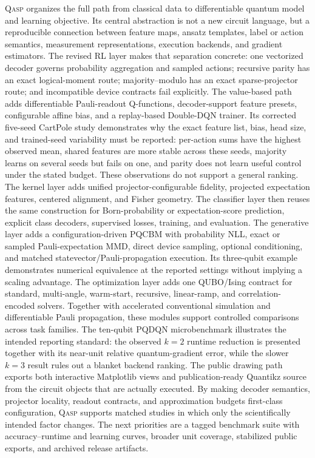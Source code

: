 \documentclass[10pt]{article}
\newcommand{\qasp}{\textsc{Qasp}}
\begin{document}
\qasp{} organizes the full path from classical data to differentiable quantum
model and learning objective.  Its central abstraction is not a new circuit
language, but a reproducible connection between feature maps, ansatz
templates, label or action semantics, measurement representations, execution
backends, and gradient estimators.  The revised RL layer makes that separation
concrete: one vectorized decoder governs probability aggregation and sampled
actions; recursive parity has an exact logical-moment route;
majority--modulo has an exact sparse-projector route; and incompatible device
contracts fail explicitly.  The value-based path adds differentiable
Pauli-readout Q-functions, decoder-support feature presets, configurable affine
bias, and a replay-based Double-DQN trainer.  Its corrected five-seed CartPole
study demonstrates why the exact feature list, bias, head size, and
trained-seed variability must be reported: per-action sums have the highest
observed mean, shared features are more stable across these seeds, majority
learns on several seeds but fails on one, and parity does not learn useful
control under the stated budget.  These observations do not support a general
ranking.  The kernel layer adds unified
projector-configurable fidelity, projected expectation features, centered
alignment, and Fisher geometry.  The classifier layer then reuses the same
construction for Born-probability or expectation-score prediction, explicit
class decoders, supervised losses, training, and evaluation.  The generative
layer adds a configuration-driven PQCBM with probability NLL, exact or sampled
Pauli-expectation MMD, direct device sampling, optional conditioning, and
matched statevector/Pauli-propagation execution.  Its three-qubit example
demonstrates numerical equivalence at the reported settings without implying a
scaling advantage.  The optimization layer adds one QUBO/Ising contract for
standard, multi-angle, warm-start, recursive, linear-ramp, and
correlation-encoded solvers.  Together with accelerated conventional
simulation and differentiable Pauli propagation, these modules support
controlled comparisons across task families.  The ten-qubit PQDQN
microbenchmark illustrates the intended reporting standard: the observed
$k=2$ runtime reduction is presented together with its near-unit relative
quantum-gradient error, while the slower $k=3$ result rules out a blanket
backend ranking.  The public drawing path exports both interactive Matplotlib views
and publication-ready Quantikz source from the circuit objects that are
actually executed.  By making decoder semantics, projector locality, readout
contracts, and approximation budgets first-class configuration, \qasp{}
supports matched studies in which only the scientifically intended factor
changes.  The next priorities are a tagged benchmark suite with
accuracy--runtime and learning curves, broader unit coverage, stabilized
public exports, and archived release artifacts.
\end{document}
